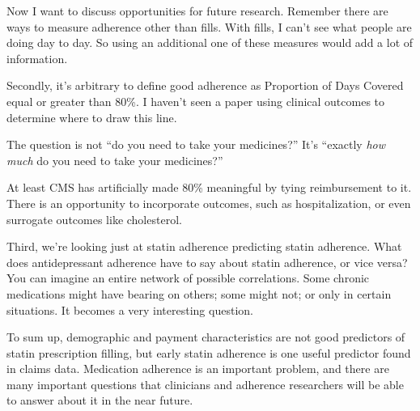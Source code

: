 \documentclass[12pt]{report}
\begin{document}
\begin{large}
Now I want to discuss opportunities for future research. Remember
there are ways to measure adherence other than fills. With fills, I
can't see what people are doing day to day. So using an additional one
of these measures would add a lot of information.

Secondly, it's arbitrary to define good adherence as Proportion of
Days Covered equal or greater than 80\%. I haven't seen a paper using
clinical outcomes to determine where to draw this line.

\end{large}

The question is not ``do you need to take your medicines?'' It's
``exactly \emph{how much} do you need to take your medicines?''

\begin{large}

At least CMS has artificially made 80\% meaningful by tying
reimbursement to it. There is an opportunity to incorporate outcomes,
such as hospitalization, or even surrogate outcomes like cholesterol.

Third, we're looking just at statin adherence predicting statin
adherence. What does antidepressant adherence have to say about statin
adherence, or vice versa? You can imagine an entire network of
possible correlations. Some chronic medications might have bearing on
others; some might not; or only in certain situations. It becomes a
very interesting question.

To sum up, demographic and payment characteristics are not good
predictors of statin prescription filling, but early statin adherence
is one useful predictor found in claims data. Medication adherence is
an important problem, and there are many important questions that
clinicians and adherence researchers will be able to answer about it
in the near future.


\end{large}
\end{document}
